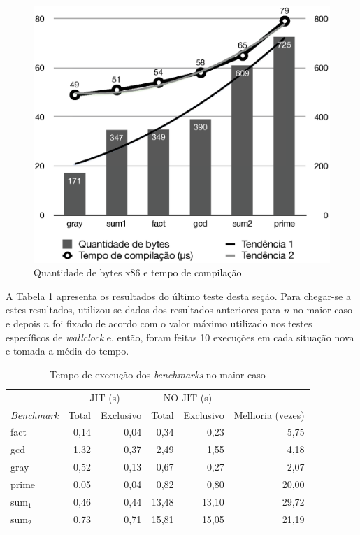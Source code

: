 \begin{figure}[ht]
  \centering
  \includegraphics[scale=0.71]{figs/tempo_compilacao}
  \caption{Quantidade de bytes x86 e tempo de compilação \label{fig:tempo-compilacao}}
\end{figure}

A Tabela \ref{tabela-execacc} apresenta os resultados do último teste
desta seção. Para chegar-se a estes resultados, utilizou-se dados dos
resultados anteriores para $n$ no maior caso e depois $n$ foi fixado
de acordo com o valor máximo utilizado nos testes específicos de
\textit{wallclock} e, então, foram feitas 10 execuções em cada
situação nova e tomada a média do tempo.

\begin{table}[ht!]
  \caption{Tempo de execução dos \textit{benchmarks} no maior caso\label{tabela-execacc}}
  \centering
  \begin{tabular}{l r r r r r}
    \toprule
& \multicolumn{2}{c}{JIT (s)} & \multicolumn{2}{c}{NO JIT (s)} \\
\cmidrule(r){2-3} \cmidrule(r){4-5}
    \textit{Benchmark}  & Total & Exclusivo & Total & Exclusivo & Melhoria (vezes) \\
    \midrule
    fact & 0,14 & 0,04  & 0,34 & 0,23  & 5,75    \\
    gcd & 1,32 & 0,37  & 2,49 & 1,55  & 4,18   \\
    gray & 0,52 & 0,13  & 0,67 & 0,27   & 2,07   \\
    prime & 0,05 & 0,04 & 0,82 & 0,80   & 20,00     \\
    sum$_1$ & 0,46 & 0,44 & 13,48 & 13,10   & 29,72    \\
    sum$_2$ & 0,73 & 0,71 & 15,81 & 15,05   & 21,19     \\
    \bottomrule
  \end{tabular}
\end{table}

